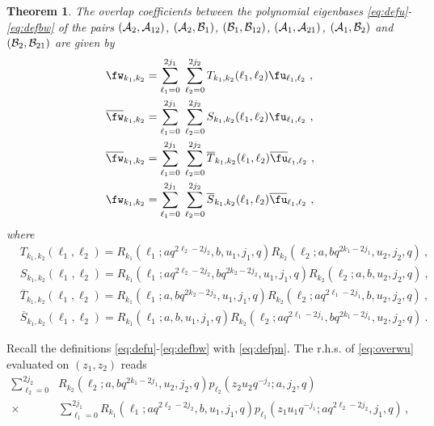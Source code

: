 \documentclass[11pt]{amsart}
\numberwithin{equation}{section}
\newtheorem{thm}{Theorem}[section]
\numberwithin{equation}{section}
\begin{document}
\begin{thm}\label{thm:overlaps}  The overlap coefficients between the  polynomial eigenbases \eqref{eq:defu}-\eqref{eq:defbw}  of the pairs $({\cal A}_2,{\cal A}_{12})$, $({\cal A}_2,{\cal B}_{1})$, $({\cal B}_1,{\cal B}_{12})$, $({\cal A}_1,{\cal A}_{21})$, $({\cal A}_1,{\cal B}_{2})$ and $({\cal B}_2,{\cal B}_{21})$ are given by
\begin{align}
& \fw_{k_1,k_2}  = \sum_{\ell_1=0}^{2j_1}\;\sum_{\ell_2=0}^{2j_2}
  T_{k_1,k_2}(\ell_1,\ell_2)\fu_{\ell_1,\ell_2}\ ,\label{eq:overwu} \\
&   \overline{\fw}_{k_1,k_2}  = \sum_{\ell_1=0}^{2j_1}\;\sum_{\ell_2=0}^{2j_2}
  S_{k_1,k_2}(\ell_1,\ell_2)\fu_{\ell_1,\ell_2}\ ,\label{eq:overwbaru}\\
   & \overline{\fw}_{k_1,k_2}  =\sum_{\ell_1=0}^{2j_1}\;\sum_{\ell_2=0}^{2j_2}
  \overline{T}_{k_1,k_2}(\ell_1,\ell_2)\overline{\fu}_{\ell_1,\ell_2}\ ,\\
  & \fw_{k_1,k_2}  = \sum_{\ell_1=0}^{2j_1}\;\sum_{\ell_2=0}^{2j_2}
  \overline{S}_{k_1,k_2}(\ell_1,\ell_2) \overline{\fu}_{\ell_1,\ell_2}\ ,\label{eq:overwubar}
\end{align}
where
\begin{align}
 &  T_{k_1,k_2}(\ell_1,\ell_2)= R_{k_1}(\ell_1;aq^{2\ell_2-2j_2},b,u_1,j_1,q) R_{k_2}(\ell_2;a,bq^{2k_1-2j_1},u_2,j_2,q)\ ,\label{eq:T} \\
 &  S_{k_1,k_2}(\ell_1,\ell_2)= R_{k_1}(\ell_1;aq^{2\ell_2-2j_2},bq^{2k_2-2j_2},u_1,j_1,q) R_{k_2}(\ell_2;a,b,u_2,j_2,q)\ ,\label{eq:S}\\
  &  \overline{T}_{k_1,k_2}(\ell_1,\ell_2)=R_{k_1}(\ell_1;a,bq^{2k_2-2j_2},u_1,j_1,q) R_{k_2}(\ell_2;aq^{2\ell_1-2j_1},b,u_2,j_2,q)\ , \label{eq:Tbar}\\
 &  \overline{S}_{k_1,k_2}(\ell_1,\ell_2)=R_{k_1}(\ell_1;a,b,u_1,j_1,q) R_{k_2}(\ell_2;aq^{2\ell_1-2j_1},bq^{2k_1-2j_1},u_2,j_2,q) \ .\label{eq:Sbar}
\end{align}
\end{thm}
\proof Recall the definitions \eqref{eq:defu}-\eqref{eq:defbw} with \eqref{eq:defpn}. The r.h.s. of \eqref{eq:overwu} evaluated on $(z_1,z_2)$ reads
\begin{align}
 \sum_{\ell_2=0}^{2j_2} 
 & R_{k_2}(\ell_2;a,bq^{2k_1-2j_1},u_2,j_2,q)
  p_{\ell_2}(z_2u_2q^{-j_2};a,j_2,q) \nonumber \\
 \times& \sum_{\ell_1=0}^{2j_1} 
  R_{k_1}(\ell_1;aq^{2\ell_2-2j_2},b,u_1,j_1,q)
  p_{\ell_1}(z_1u_1q^{-j_1};aq^{2\ell_2-2j_2},j_1,q)\,, 
\end{align}
\end{document}
